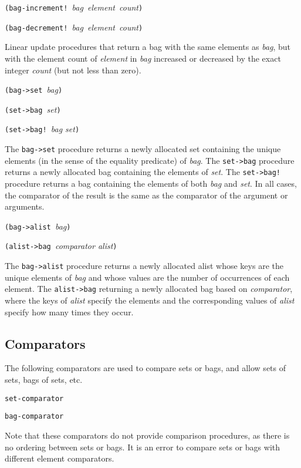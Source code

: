 \texttt{(bag-increment!\ }\emph{bag\texttt{\ }element\texttt{\ }count}\texttt{)}

\texttt{(bag-decrement!\ }\emph{bag\texttt{\ }element\texttt{\ }count}\texttt{)}

Linear update procedures that return a bag with the same elements as
\emph{bag}, but with the element count of \emph{element} in \emph{bag}
increased or decreased by the exact integer \emph{count} (but not less
than zero).

\texttt{(bag-\textgreater{}set\ }\emph{bag}\texttt{)}

\texttt{(set-\textgreater{}bag\ }\emph{set}\texttt{)}

\texttt{(set-\textgreater{}bag!\ }\emph{bag set}\texttt{)}

The \texttt{bag-\textgreater{}set} procedure returns a newly allocated
set containing the unique elements (in the sense of the equality
predicate) of \emph{bag}. The \texttt{set-\textgreater{}bag} procedure
returns a newly allocated bag containing the elements of \emph{set}. The
\texttt{set-\textgreater{}bag!} procedure returns a bag containing the
elements of both \emph{bag} and \emph{set}. In all cases, the comparator
of the result is the same as the comparator of the argument or
arguments.

\texttt{(bag-\textgreater{}alist\ }\emph{bag}\texttt{)}

\texttt{(alist-\textgreater{}bag\ }\emph{comparator alist}\texttt{)}

The \texttt{bag-\textgreater{}alist} procedure returns a newly allocated
alist whose keys are the unique elements of \emph{bag} and whose values
are the number of occurrences of each element. The
\texttt{alist-\textgreater{}bag} returning a newly allocated bag based
on \emph{comparator}, where the keys of \emph{alist} specify the
elements and the corresponding values of \emph{alist} specify how many
times they occur.

\hypertarget{Comparators}{\subsection{Comparators}\label{Comparators}}

The following comparators are used to compare sets or bags, and allow
sets of sets, bags of sets, etc.

\texttt{set-comparator}

\texttt{bag-comparator}

Note that these comparators do not provide comparison procedures, as
there is no ordering between sets or bags. It is an error to compare
sets or bags with different element comparators.

